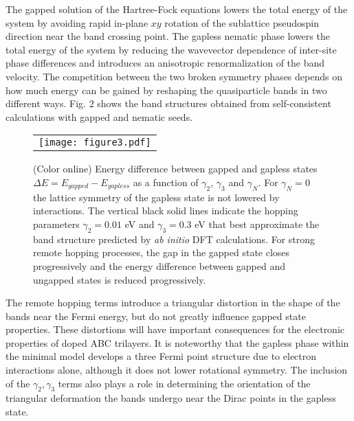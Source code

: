 \documentclass[twocolumn,prb,showpacs,preprintnumbers,amsmath,amssymb]{revtex4}
\begin{document}
The gapped solution of the Hartree-Fock equations  
lowers the total energy of the system by avoiding rapid in-plane $xy$ rotation of 
the sublattice pseudospin direction near the 
band crossing point.\cite{hongki}
The gapless nematic phase lowers the total energy of the system by
reducing the wavevector dependence of inter-site phase differences and 
introduces an anisotropic renormalization of the band velocity.
The competition between the two broken symmetry phases 
depends on how much energy can be gained by 
reshaping the quasiparticle bands in two different ways.  
Fig. 2 shows the band structures obtained from self-consistent  
calculations with gapped and nematic seeds.
\begin{figure}[t]
\begin{center}
\begin{tabular}{c}
\texttt{[image: figure3.pdf]}  \quad \quad \quad \quad
\end{tabular}
\caption{(Color online)
Energy difference between gapped and gapless states $\Delta E = E_{gapped} - E_{gapless}$
as a function of $\gamma_2$, $\gamma_3$ and $\gamma_N$.
For $\gamma_N=0$ the lattice symmetry of the gapless state is not lowered by 
interactions.  The vertical black solid lines indicate the hopping parameters 
$\gamma_2 = 0.01$ eV and $\gamma_3 = 0.3$ eV
that best approximate the band structure predicted by {\em ab initio} DFT calculations.
For strong remote hopping processes, the gap in the gapped state closes progressively and
the energy difference between gapped and ungapped states is reduced progressively.
}
\label{energy}
\end{center}
\end{figure}
The remote hopping terms introduce a 
triangular distortion in the shape of the bands near the Fermi energy, 
but do not greatly influence gapped state properties.  
These distortions will have important consequences for the electronic properties
of doped ABC trilayers.  
It is noteworthy that the gapless phase within the minimal model develops
a three Fermi point structure due to electron interactions alone, although
it does not lower rotational symmetry.  
The inclusion of the $\gamma_2, \gamma_3$ terms also plays a role in 
determining the orientation of the triangular deformation 
the bands undergo near the Dirac points in the gapless state.
\end{document}
